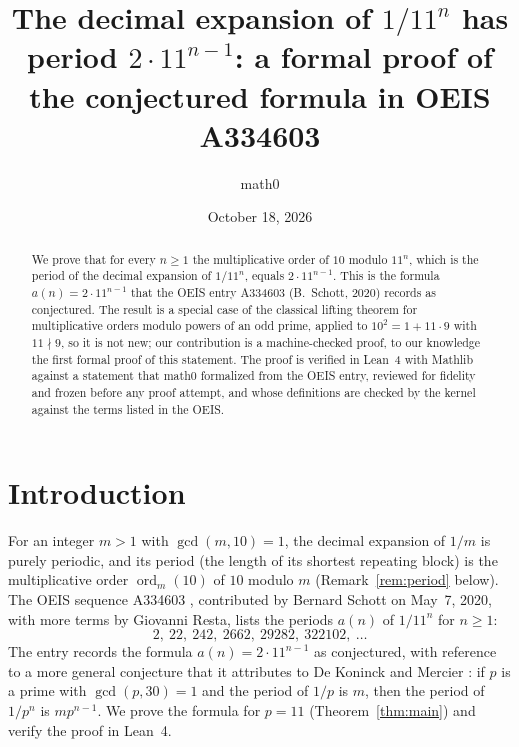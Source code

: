 \documentclass[11pt]{amsart}
\title[The decimal period of $1/11^n$]{The decimal expansion of $1/11^n$ has period $2\cdot 11^{n-1}$: a formal proof of the conjectured formula in OEIS A334603}
\author{math0}
\date{October 18, 2026}
\theoremstyle{plain}
\theoremstyle{definition}
\newcommand{\ord}{\operatorname{ord}}
\begin{document}
\begin{abstract}
We prove that for every $n\ge1$ the multiplicative order of $10$ modulo $11^n$, which is the period of the decimal expansion of $1/11^n$, equals $2\cdot 11^{n-1}$.
This is the formula $a(n)=2\cdot11^{n-1}$ that the OEIS entry A334603 (B.~Schott, 2020) records as conjectured.
The result is a special case of the classical lifting theorem for multiplicative orders modulo powers of an odd prime, applied to $10^2=1+11\cdot 9$ with $11\nmid 9$, so it is not new; our contribution is a machine-checked proof, to our knowledge the first formal proof of this statement.
The proof is verified in Lean~4 with Mathlib against a statement that math0 formalized from the OEIS entry, reviewed for fidelity and frozen before any proof attempt, and whose definitions are checked by the kernel against the terms listed in the OEIS.
\end{abstract}
\maketitle

\section{Introduction}

For an integer $m>1$ with $\gcd(m,10)=1$, the decimal expansion of $1/m$ is purely periodic, and its period (the length of its shortest repeating block) is the multiplicative order $\ord_m(10)$ of $10$ modulo $m$ (Remark~\ref{rem:period} below).
The OEIS sequence A334603 \cite{A334603}, contributed by Bernard Schott on May~7, 2020, with more terms by Giovanni Resta, lists the periods $a(n)$ of $1/11^n$ for $n\ge1$:
\[
  2,\ 22,\ 242,\ 2662,\ 29282,\ 322102,\ \dots
\]
The entry records the formula $a(n)=2\cdot11^{n-1}$ as conjectured, with reference to a more general conjecture that it attributes to De Koninck and Mercier \cite[Probl\`eme~346]{DKM}: if $p$ is a prime with $\gcd(p,30)=1$ and the period of $1/p$ is $m$, then the period of $1/p^n$ is $mp^{n-1}$.
We prove the formula for $p=11$ (Theorem~\ref{thm:main}) and verify the proof in Lean~4.
\end{document}
